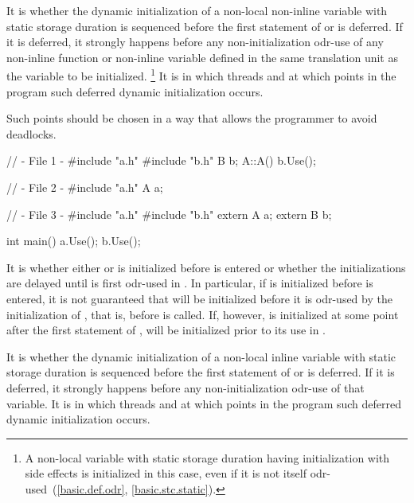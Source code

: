 \pnum
{}%
It is 
whether the dynamic initialization of a
non-local non-inline variable with static storage duration
is sequenced before the first statement of  or is deferred.
If it is deferred, it strongly happens before
any non-initialization odr-use
of any non-inline function or non-inline variable
defined in the same translation unit as the variable to be initialized.%
\footnote{A non-local variable with static storage duration
having initialization
with side effects is initialized in this case,
even if it is not itself odr-used~(\ref{basic.def.odr}, \ref{basic.stc.static}).}
It is 
in which threads and at which points in the program such deferred dynamic initialization occurs.
\begin{note}
Such points should be chosen in a way that allows the programmer to avoid deadlocks.
\end{note}
\begin{example}
\begin{codeblock}
// - File 1 -
#include "a.h"
#include "b.h"
B b;
A::A(){
  b.Use();
}

// - File 2 -
#include "a.h"
A a;

// - File 3 -
#include "a.h"
#include "b.h"
extern A a;
extern B b;

int main() {
  a.Use();
  b.Use();
}
\end{codeblock}

It is 
whether either  or  is
initialized before  is entered or whether the
initializations are delayed until  is first odr-used in
. In particular, if  is initialized before
 is entered, it is not guaranteed that  will be
initialized before it is odr-used by the initialization of , that
is, before  is called. If, however,  is initialized
at some point after the first statement of ,  will
be initialized prior to its use in .
\end{example}

\pnum
It is 
whether the dynamic initialization of a
non-local inline variable with static storage duration
is sequenced before the first statement of  or is deferred.
If it is deferred, it strongly happens before
any non-initialization odr-use
of that variable.
It is 
in which threads and at which points in the program such deferred dynamic initialization occurs.

